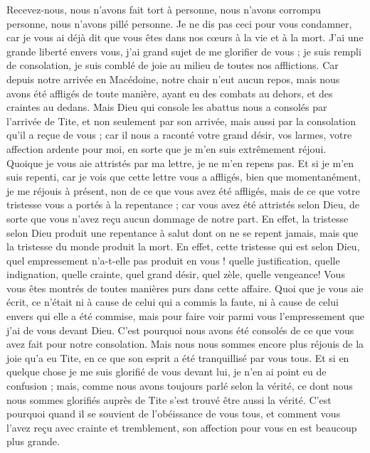 \begin{multicols}{2}
Recevez-nous, nous n'avons fait tort à personne, nous n'avons corrompu personne, nous n'avons pillé personne.
Je ne dis pas ceci pour vous condamner, car je vous ai déjà dit que vous êtes dans nos cœurs à la vie et à la mort.
J'ai une grande liberté envers vous, j'ai grand sujet de me glorifier de vous ; je suis rempli de consolation, je suis comblé de joie au milieu de toutes nos afflictions.
Car depuis notre arrivée en Macédoine, notre chair n’eut aucun repos, mais nous avons été affligés de toute manière, ayant eu des combats au dehors, et des craintes au dedans.
Mais Dieu qui console les abattus nous a consolés par l’arrivée de Tite,
et non seulement par son arrivée, mais aussi par la consolation qu'il a reçue de vous ; car il nous a raconté votre grand désir, vos larmes, votre affection ardente pour moi, en sorte que je m'en suis extrêmement réjoui.
Quoique je vous aie attristés par ma lettre, je ne m'en repens pas. Et si je m'en suis repenti, car je vois que cette lettre vous a affligés, bien que momentanément,
je me réjouis à présent, non de ce que vous avez été affligés, mais de ce que votre tristesse vous a portés à la repentance ; car vous avez été attristés selon Dieu, de sorte que vous n'avez reçu aucun dommage de notre part.
En effet, la tristesse selon Dieu produit une repentance à salut dont on ne se repent jamais, mais que la tristesse du monde produit la mort.
En effet, cette tristesse qui est selon Dieu, quel empressement n’a-t-elle pas produit en vous ! quelle justification, quelle indignation, quelle crainte, quel grand désir, quel zèle, quelle vengeance! Vous  vous êtes montrés de toutes manières purs dans cette affaire.
Quoi que je vous aie écrit, ce n'était ni à cause de celui qui a commis la faute, ni à cause de celui envers qui elle a été commise, mais pour faire voir parmi vous l'empressement que j'ai de vous devant Dieu.
C'est pourquoi nous avons été consolés de ce que vous avez fait pour notre consolation. Mais nous nous sommes encore plus réjouis de la joie qu'a eu Tite, en ce que son esprit a été tranquillisé par vous tous.
Et si en quelque chose je me suis glorifié de vous devant lui, je n’en ai point eu de confusion ; mais, comme nous avons toujours parlé selon la vérité, ce dont nous nous sommes glorifiés auprès de Tite s’est trouvé être aussi la vérité.
C'est pourquoi quand il se souvient de l'obéissance de vous tous, et comment vous l'avez reçu avec crainte et tremblement, son affection pour vous en est beaucoup plus grande.

\end{multicols}

